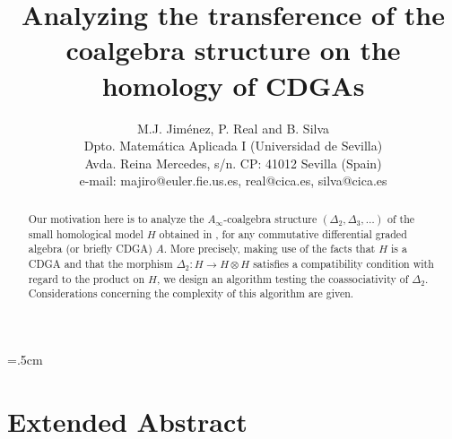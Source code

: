 \title{\Large \bf Analyzing  the transference of the coalgebra
structure on the homology of CDGAs}
\author{\normalsize M.J. Jim\'{e}nez, P. Real and B. Silva\\
\normalsize Dpto. Matem\'{a}tica Aplicada I (Universidad de Sevilla)\\
\normalsize Avda. Reina Mercedes, s/n. CP: 41012 Sevilla (Spain)\\
\normalsize  e-mail: majiro@euler.fie.us.es, real@cica.es,
silva@cica.es}
\textheight=615pt
\textwidth=425pt
\oddsidemargin=0pt
\headheight=0pt
\headsep=7pt
\hoffset=0pt
\voffset=0pt
\topmargin=10pt
\marginparsep=10pt
\marginparwidth=30pt
\footheight=10pt
\footskip=40pt
\parskip=.5cm
\setlength{\baselineskip}{8ex}
\newcommand{\ra}{\rightarrow}
\newcommand{\la}{\leftarrow}
\newcommand{\scst}{\scriptscriptstyle}
\newcommand{\ot}{\otimes}
\newcommand{\Z}{\Bbb Z}
\newcommand{\pa}{\partial}
\newcommand{\al}{\alpha}
\newcommand{\be}{\beta}
\newtheorem{prp}{Proposition}[section]
\newtheorem{lmm}[prp]{Lemma}
\newtheorem{thr}[prp]{Theorem}
\newtheorem{dfn}[prp]{Definition}
\newtheorem{rmr}[prp]{Remark}
\newtheorem{crl}[prp]{Corollary}
\newtheorem{ejemplo}[prp]{Example}
\newtheorem{notacion}[prp]{Notation}


\sloppy
\maketitle
\vspace{0.5cm}

\begin{abstract}

    Our motivation here is to analyze the $A_{\infty}$-coalgebra structure
 $(\Delta_2, \Delta_3, \ldots)$
of the small homological model $H$ obtained in \cite{Moscu}, for any commutative differential
graded algebra (or briefly CDGA) $A$. More precisely, making use
of the facts that $H$ is a CDGA and
that the morphism $\Delta_2: H \rightarrow
H\ot H$ satisfies a compatibility condition with regard to the product
on $H$, we design an  algorithm testing
the coassociativity of
 $\Delta_2$. Considerations concerning the complexity of this
 algorithm are given.

\end{abstract}

\section{Extended Abstract}



